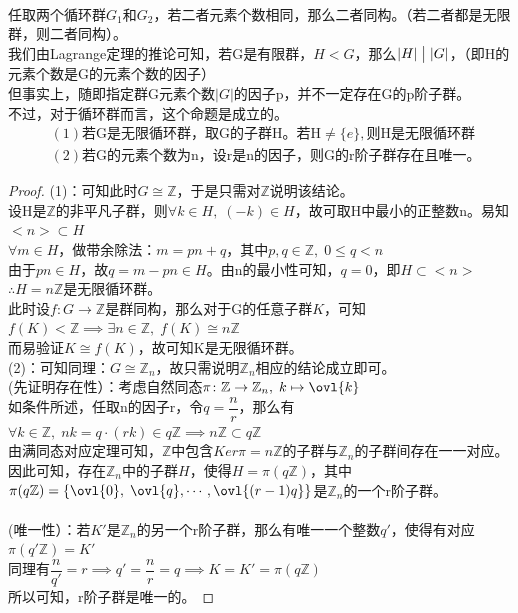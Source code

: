 \\
任取两个循环群$G_1$和$G_2$，若二者元素个数相同，那么二者同构。（若二者都是无限群，则二者同构）。\\
我们由Lagrange定理的推论可知，若G是有限群，$H<G$，那么$|H|\bigm||G|$，（即H的元素个数是G的元素个数的因子）\\
但事实上，随即指定群G元素个数$|G|$的因子p，并不一定存在G的p阶子群。\\
不过，对于循环群而言，这个命题是成立的。\\
\begin{align*}
&(1)\text{若G是无限循环群，取G的子群H。若H}\neq \{e\},\text{则H是无限循环群}\\
&(2)\text{若G的元素个数为n，设r是n的因子，则G的r阶子群存在且唯一。}
\end{align*}
\begin{proof}
(1)：可知此时$G\cong \mathbb{Z}$，于是只需对$\mathbb{Z}$说明该结论。\\
设H是$\mathbb{Z}$的非平凡子群，则$\forall k\in H,\; (-k)\in H$，故可取H中最小的正整数n。易知$<n>\subset H$\\
$\forall m\in H$，做带余除法：$m=pn+q$，其中$p,q\in \mathbb{Z},\; 0\leq q < n$\\
由于$pn\in H$，故$q=m-pn\in H$。由n的最小性可知，$q=0$，即$H\subset <n>$\\
$\therefore H=n\mathbb{Z}$是无限循环群。\\
此时设$f\colon G\to \mathbb{Z}$是群同构，那么对于G的任意子群$K$，可知$f(K)<\mathbb{Z}\implies \exists n\in \mathbb{Z},\; f(K)\cong n\mathbb{Z}$\\
而易验证$K\cong f(K)$，故可知K是无限循环群。\\
(2)：可知同理：$G\cong \mathbb{Z}_n$，故只需说明$\mathbb{Z}_n$相应的结论成立即可。\\
(先证明存在性）：考虑自然同态$\pi\colon \mathbb{Z}\to \mathbb{Z}_n,\; k\mapsto \ovl{k}$\\
如条件所述，任取n的因子r，令$q=\dfrac{n}{r}$，那么有$\forall k\in \mathbb{Z},\; nk=q\cdot (rk)\in q\mathbb{Z}\implies n\mathbb{Z}\subset q\mathbb{Z}$\\
由满同态对应定理可知，$\mathbb{Z}$中包含$Ker\pi=n\mathbb{Z}$的子群与$\mathbb{Z}_n$的子群间存在一一对应。\\
因此可知，存在$\mathbb{Z}_n$中的子群$H$，使得$H=\pi(q\mathbb{Z})$，其中$\pi(q\mathbb{Z})=\{\ovl{0},\;\ovl{q},\cdots,\ovl{(r-1)q}\}$是$\mathbb{Z}_n$的一个r阶子群。\\
\\
(唯一性）：若$K'$是$\mathbb{Z}_n$的另一个r阶子群，那么有唯一一个整数$q'$，使得有对应$\pi(q'\mathbb{Z})=K'$\\
同理有$\dfrac{n}{q'}=r\implies q'=\dfrac{n}{r}=q\implies K=K'=\pi(q\mathbb{Z})$\\
所以可知，r阶子群是唯一的。
\end{proof}
